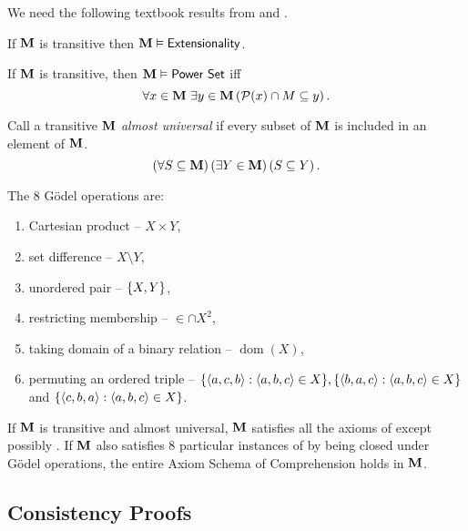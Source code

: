 We need the following textbook results from \autocite{kunen1980} and \autocite{jech1973}.

\begin{lemma} \label{lemma:transitive_extensional}
    If \(\mathbf{M}\) is transitive then \(\mathbf{M}\vDash{\normalfont\textsf{Extensionality}}\).
\end{lemma}

\begin{lemma} \label{lemma:power_set}
    If \(\mathbf{M}\) is transitive, then \(\mathbf{M}\vDash{\normalfont\textsf{Power Set}}\) iff
    \[ \forall x\in\mathbf{M}\ \exists y\in \mathbf{M} \left(\mathcal{P}(x)\cap M \subseteq y\right). \]
\end{lemma}

\begin{definition}
    Call a transitive \(\mathbf{M}\) \emph{almost universal} if
    every subset of \(\mathbf{M}\) is included in an element of \(\mathbf{M}\).
    \[ \left(\forall S\subseteq \mathbf{M}\right)\left(\exists Y\in \mathbf{M}\right)\left(S\subseteq Y\right). \]
\end{definition}
\begin{definition}
    The 8 Gödel operations are:
    \begin{enumerate}
        \item Cartesian product -- \(X\times Y\),
        \item set difference -- \(X\setminus Y\),
        \item unordered pair -- \({\left\{ X, Y \right\}}\),
        \item restricting membership --  \(\in \cap X^2\),
        \item taking domain of a binary relation -- \(\operatorname{dom}(X)\),
        \item permuting an ordered triple -- \({\left\{ \left\langle a,c,b\right\rangle: \left\langle a,b,c\right\rangle\in X \right\}}, {\left\{ \left\langle b,a,c\right\rangle: \left\langle a,b,c\right\rangle\in X \right\}}\) and \({\left\{ \left\langle c,b,a\right\rangle: \left\langle a,b,c\right\rangle\in X \right\}}\).
    \end{enumerate}
\end{definition}
\begin{theorem} \label{theorem:jech_zf_model}
    If \(\mathbf{M}\) is transitive and almost universal,
    \(\mathbf{M}\) satisfies all the axioms of \ZFminus except possibly .
    If \(\mathbf{M}\) also satisfies 8 particular instances of  by being closed under Gödel operations,
    the entire Axiom Schema of Comprehension holds in \(\mathbf{M}\).
\end{theorem}

\subsection{Consistency Proofs}

